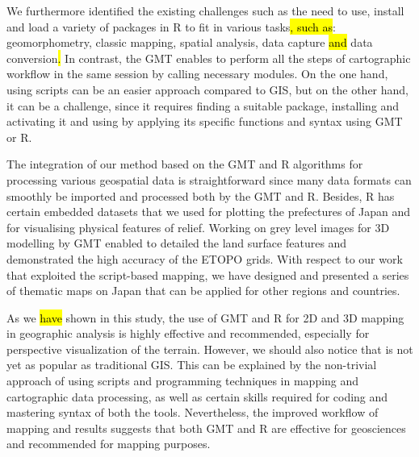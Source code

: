 \documentclass[land,article,submit,pdftex,moreauthors]{Definitions/mdpi}
\begin{document}
We furthermore identified the existing challenges such as the need to use, install and load a variety of packages in R to fit in various tasks\hl{, such as}: geomorphometry, classic mapping, spatial analysis, data capture \hl{and} data conversion\hl{. }In contrast, the GMT enables to perform all the steps of cartographic workflow in the same session by calling necessary modules. On the one hand, using scripts can be an easier approach  compared to GIS, but on the other hand, it can be a challenge, since it requires finding a suitable package, installing and activating it and using by applying its specific functions and syntax using GMT or R. 

The integration of our method based on the GMT and R algorithms for processing various geospatial data is straightforward since many data formats can smoothly be imported and processed both by the GMT and R. Besides, R has certain embedded datasets that we used for plotting the prefectures of Japan and for visualising physical features of relief. Working on grey level images for 3D modelling by GMT enabled to detailed the land surface features and demonstrated the high accuracy of the ETOPO grids. With respect to our work that exploited the script-based mapping, we have designed and presented a series of thematic maps on Japan that can be applied for other regions and countries. 

As we \hl{have }shown in this study, the use of GMT and R for 2D and 3D mapping in geographic analysis is highly effective and recommended, especially for perspective visualization of the terrain. However, we should also notice that is not yet as popular as traditional GIS. This can be explained by the non-trivial approach of using scripts and programming techniques in mapping and cartographic data processing, as well as certain skills required for coding and mastering syntax of both the tools. Nevertheless, the improved workflow of mapping and results suggests that both GMT and R are effective for geosciences and\hl{ }recommended for mapping purposes.

\end{document}
